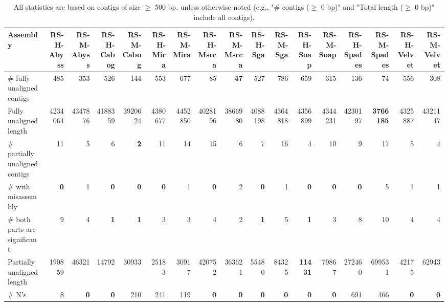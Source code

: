 \documentclass[12pt,a4paper]{article}
\begin{document}
\begin{table}[ht]
\begin{center}
\caption{All statistics are based on contigs of size $\geq$ 500 bp, unless otherwise noted (e.g., "\# contigs ($\geq$ 0 bp)" and "Total length ($\geq$ 0 bp)" include all contigs).}
\begin{tabular}{|l*{16}{|r}|}
\hline
Assembly & RS-H-Abyss & RS-M-Abyss & RS-H-Cabog & RS-M-Cabog & RS-H-Mira & RS-M-Mira & RS-H-Msrca & RS-M-Msrca & RS-H-Sga & RS-M-Sga & RS-H-Soap & RS-M-Soap & RS-H-Spades & RS-M-Spades & RS-H-Velvet & RS-M-Velvet \\ \hline
\# fully unaligned contigs & 485 & 353 & 526 & 144 & 553 & 677 & 85 & {\bf 47} & 527 & 786 & 659 & 315 & 136 & 74 & 556 & 308 \\ \hline
Fully unaligned length & 4234064 & 4347876 & 4188359 & 3920624 & 4380677 & 4452850 & 4028196 & 3866980 & 4088198 & 4364818 & 4356899 & 4344231 & 4230197 & {\bf 3766185} & 4325887 & 4321147 \\ \hline
\# partially unaligned contigs & 11 & 5 & 6 & {\bf 2} & 11 & 14 & 15 & 6 & 7 & 16 & 4 & 10 & 9 & 17 & 5 & 4 \\ \hline
\hspace{5mm}\# with misassembly & {\bf 0} & 1 & {\bf 0} & {\bf 0} & {\bf 0} & 1 & {\bf 0} & 2 & {\bf 0} & 1 & {\bf 0} & {\bf 0} & {\bf 0} & 5 & 1 & 1 \\ \hline
\hspace{5mm}\# both parts are significant & 9 & 4 & {\bf 1} & {\bf 1} & 3 & 3 & 4 & 2 & {\bf 1} & 5 & {\bf 1} & 3 & 8 & 10 & 4 & 4 \\ \hline
Partially unaligned length & 190859 & 46321 & 14792 & 30933 & 25183 & 30917 & 420752 & 363621 & 55480 & 84325 & {\bf 11431} & 79867 & 272460 & 699531 & 42175 & 62943 \\ \hline
\# N's & 8 & {\bf 0} & {\bf 0} & 210 & 241 & 119 & {\bf 0} & {\bf 0} & {\bf 0} & {\bf 0} & {\bf 0} & {\bf 0} & 691 & 466 & {\bf 0} & {\bf 0} \\ \hline
\end{tabular}
\end{center}
\end{table}
\end{document}
